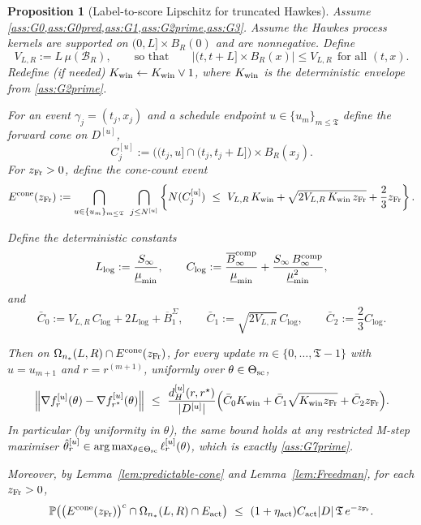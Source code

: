 \documentclass{statsoc}
\newtheorem{proposition}[proposition]{Proposition}
\newcommand{\1}{\mathbbm{1}}
\newcommand{\Tmax}{\mathfrak{T}}
\begin{document}

\begin{proposition}[Label-to-score Lipschitz for truncated Hawkes]
\label{prop:hawkes-G7prime}
Assume \cref{ass:G0,ass:G0pred,ass:G1,ass:G2prime,ass:G3}.
Assume the Hawkes process kernels are supported on $(0,L]\times B_R(0)$ and are nonnegative.
Define
\[
V_{L,R}:=L\,\mu(\mathcal B_R),
\qquad\text{so that}\qquad
|(t,t+L]\times B_R(x)|\le V_{L,R}\ \ \text{for all }(t,x).
\]
Redefine (if needed) $K_{\rm win}\leftarrow K_{\rm win}\vee 1$, where $K_{\rm win}$ is the deterministic envelope from
\cref{ass:G2prime}.

For an event $\gamma_j=(t_j,x_j)$ and a schedule endpoint $u\in\{u_m\}_{m\le\Tmax}$ define the forward cone on $D^{[u]}$,
\[
C_j^{[u]}:=\big((t_j,u]\cap(t_j,t_j+L]\big)\times B_R(x_j).
\]
For $z_{\rm Fr}>0$, define the cone-count event
\[
E^{\rm cone}(z_{\rm Fr}):=
\bigcap_{u\in\{u_m\}_{m\le\Tmax}}\ \bigcap_{j\le N^{[u]}}
\left\{
N(C_j^{[u]})
\ \le\
V_{L,R}\,K_{\rm win}
+\sqrt{2V_{L,R}\,K_{\rm win}\,z_{\rm Fr}}
+\frac{2}{3}z_{\rm Fr}
\right\}.
\]

Define the deterministic constants
\[
L_{\log}:=\frac{S_\infty}{\underline\mu_{\min}},\qquad
C_{\log}:=\frac{\overline B_\infty^{\rm comp}}{\underline\mu_{\min}}
+\frac{S_\infty\,B_\infty^{\rm comp}}{\underline\mu_{\min}^2},
\]
and
\[
\bar C_0:=V_{L,R}\,C_{\log}+2L_{\log}+\overline B_1^\Sigma,\qquad
\bar C_1:=\sqrt{2V_{L,R}}\,C_{\log},\qquad
\bar C_2:=\frac{2}{3}C_{\log}.
\]

Then on $\Omega_{n_*}(L,R)\cap E^{\rm cone}(z_{\rm Fr})$, for every update $m\in\{0,\dots,\Tmax-1\}$ with $u=u_{m+1}$
and $r=r^{(m+1)}$, uniformly over $\theta\in\Theta_{\rm sc}$,
\[
\left\Vert \nabla f_{r}^{[u]}(\theta) - \nabla f_{r^\star}^{[u]}(\theta)\right\Vert
\ \le\ 
\frac{d_H^{[u]}(r,r^\star)}{|D^{[u]}|}
\Big(\bar C_0 K_{\rm win} + \bar C_1\sqrt{K_{\rm win} z_{\rm Fr}} + \bar C_2 z_{\rm Fr}\Big).
\]
In particular (by uniformity in $\theta$), the same bound holds at any restricted M-step maximiser
$\hat\theta_r^{[u]}\in\arg\max_{\theta\in\Theta_{\rm sc}}\ell_r^{[u]}(\theta)$, which is exactly \cref{ass:G7prime}.

Moreover, by Lemma~\ref{lem:predictable-cone} and Lemma~\ref{lem:Freedman}, for each $z_{\rm Fr}>0$,
\[
\mathbb P\!\left(\big(E^{\rm cone}(z_{\rm Fr})\big)^c\cap\Omega_{n_*}(L,R)\cap E_{\rm act}\right)
\ \le\ (1+\eta_{\rm act})C_{\rm act}|D|\,\Tmax\,e^{-z_{\rm Fr}}.
\]
\end{proposition}
\end{document}
